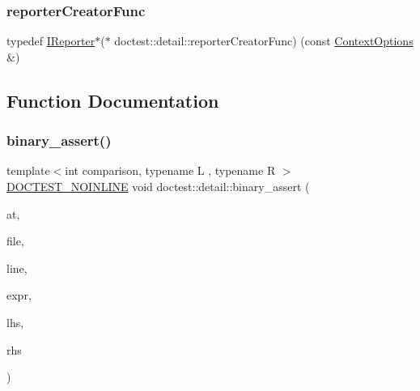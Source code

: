 \mbox{\label{namespacedoctest_1_1detail_a030c0c44c25bdebe6a83858d1f454f72}} 
\subsubsection{\texorpdfstring{reporter\+Creator\+Func}{reporterCreatorFunc}}
{\footnotesize\ttfamily typedef \hyperlink{structdoctest_1_1IReporter}{I\+Reporter}$\ast$($\ast$ doctest\+::detail\+::reporter\+Creator\+Func) (const \hyperlink{structdoctest_1_1ContextOptions}{Context\+Options} \&)}



\subsection{Function Documentation}
\mbox{\label{namespacedoctest_1_1detail_a570279a22ca888528e87a426853a0288}} 
\subsubsection{\texorpdfstring{binary\+\_\+assert()}{binary\_assert()}}
{\footnotesize\ttfamily template$<$int comparison, typename L , typename R $>$ \\
\hyperlink{doctest_8h_a47e9d3609dfcc90b9a630ff33b9524d6}{D\+O\+C\+T\+E\+S\+T\+\_\+\+N\+O\+I\+N\+L\+I\+NE} void doctest\+::detail\+::binary\+\_\+assert (\begin{DoxyParamCaption}\item[{\hyperlink{namespacedoctest_1_1assertType_ae1bb5bed722f34f1c38b83cb19d326d3}{assert\+Type\+::\+Enum}}]{at,  }\item[{const char $\ast$}]{file,  }\item[{int}]{line,  }\item[{const char $\ast$}]{expr,  }\item[{const \hyperlink{doctest_8h_af2901cafb023c57fb672ccb1bf14f2eb}{D\+O\+C\+T\+E\+S\+T\+\_\+\+R\+E\+F\+\_\+\+W\+R\+AP}(L)}]{lhs,  }\item[{const \hyperlink{doctest_8h_af2901cafb023c57fb672ccb1bf14f2eb}{D\+O\+C\+T\+E\+S\+T\+\_\+\+R\+E\+F\+\_\+\+W\+R\+AP}(R)}]{rhs }\end{DoxyParamCaption})}

